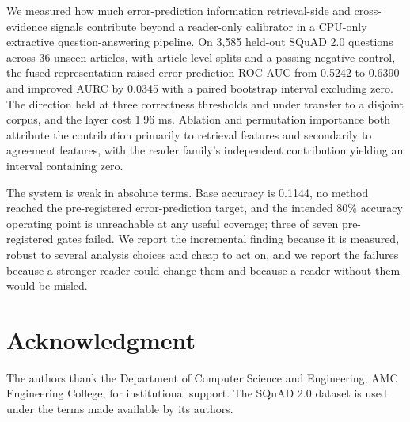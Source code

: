 \documentclass[conference]{IEEEtran}
\begin{document}
We measured how much error-prediction information retrieval-side and cross-evidence signals contribute beyond a reader-only calibrator in a CPU-only extractive question-answering pipeline. On 3,585 held-out SQuAD 2.0 questions across 36 unseen articles, with article-level splits and a passing negative control, the fused representation raised error-prediction ROC-AUC from 0.5242 to 0.6390 and improved AURC by 0.0345 with a paired bootstrap interval excluding zero. The direction held at three correctness thresholds and under transfer to a disjoint corpus, and the layer cost 1.96 ms. Ablation and permutation importance both attribute the contribution primarily to retrieval features and secondarily to agreement features, with the reader family's independent contribution yielding an interval containing zero.

The system is weak in absolute terms. Base accuracy is 0.1144, no method reached the pre-registered error-prediction target, and the intended 80\% accuracy operating point is unreachable at any useful coverage; three of seven pre-registered gates failed. We report the incremental finding because it is measured, robust to several analysis choices and cheap to act on, and we report the failures because a stronger reader could change them and because a reader without them would be misled.

\section{Acknowledgment}

The authors thank the Department of Computer Science and Engineering, AMC Engineering College, for institutional support. The SQuAD 2.0 dataset is used under the terms made available by its authors.
\end{document}
